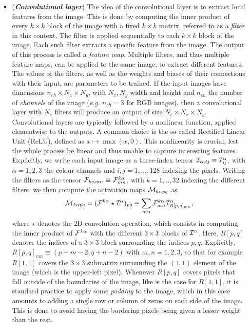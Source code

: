 \begin{itemize}
	\item (\textbf{\emph{Convolutional layer}})
		The idea of the convolutional layer is to extract local features from the image.
		This is done by computing the inner product of every $k\times k$ block of the image with a fixed $k\times k$ matrix, referred to as a \emph{filter} in this context. The filter is applied sequentially to each $k\times k$ block of the image.
		Each such filter extracts a specific feature from the image. The output of this process is called a \emph{feature map}. Multiple filters, and thus multiple feature maps, can be applied to the same image, to extract different features.
		The values of the filters, as well as the weights and biases of their connections with their input, are parameters to be trained.
		If the input images have dimensions $n_{ch}\times N_x\times N_y$, with $N_x,N_y$ width and height and $n_{ch}$ the number of \emph{channels} of the image (\emph{e.g.} $n_{ch}=3$ for RGB images), then a convolutional layer with $N_c$ filters will produce an output of size $N_c\times N_x\times N_y$.
		Convolutional layers are typically followed by a nonlinear function, applied elementwise to the outputs. A common choice is the so-called Rectified Linear Unit (ReLU), defined as $x\mapsto\max(x,0)$.
		This nonlinearity is crucial, lest the whole process be linear and thus unable to capture interesting features.
		Explicitly, we write each input image as a three-index tensor ${\mathcal{I}}_{\alpha,ij}\equiv{\mathcal{I}}^\alpha_{ij}$, with $\alpha=1,2,3$ the colour channels and $i,j=1,...,128$ indexing the pixels.
		Writing the filters as the tensor ${\mathcal{F}}_{k\alpha mn}\equiv{\mathcal{F}}^{k\alpha}_{mn}$, with $k=1,..,32$ indexing the different filters, we then compute the activation maps ${\mathcal{M}}_{k\alpha pq}$ as
		\begin{equation}
			{\mathcal{M}}_{k\alpha pq} = ({\mathcal{F}}^{k\alpha}\star{\mathcal{I}}^{\alpha})_{pq} \equiv
			\sum_{mn} {\mathcal{F}}^{k\alpha}_{mn} {\mathcal{I}}^\alpha_{R[p,q]_{mn}},
		\end{equation}
		where $\star$ denotes the $2$D convolution operation, which consists in computing the inner product of ${\mathcal{F}}^{k\alpha}$ with the different $3\times3$ blocks of ${\mathcal{I}}^\alpha$. Here, $R[p,q]$ denotes the indices of a $3\times3$ block surrounding the indices $p,q$.
		Explicitly, $R[p,q]_{mn}\equiv (p+m-2,q+n-2)$ with $m,n=1,2,3$, so that for example $R[1,1]$ covers the $3\times3$ submatrix surrounding the $(1,1)$ element of the image (which is the upper-left pixel). Whenever $R[p,q]$ covers pixels that fall outside of the boundaries of the image, like is the case for $R[1,1]$, it is standard practice to apply some \emph{padding} to the image, which in this case amounts to adding a single row or column of zeros on each side of the image. This is done to avoid having the bordering pixels being given a lesser weight than the rest.

\end{itemize}
